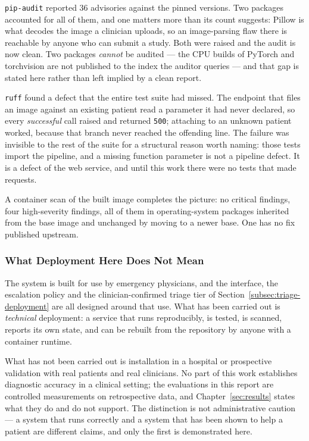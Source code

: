 \texttt{pip-audit} reported 36 advisories against the pinned versions. Two packages accounted
for all of them, and one matters more than its count suggests: Pillow is what decodes the image
a clinician uploads, so an image-parsing flaw there is reachable by anyone who can submit a
study. Both were raised and the audit is now clean. Two packages \emph{cannot} be audited ---
the CPU builds of PyTorch and torchvision are not published to the index the auditor queries
--- and that gap is stated here rather than left implied by a clean report.

\texttt{ruff} found a defect that the entire test suite had missed. The endpoint that files an
image against an existing patient read a parameter it had never declared, so every
\emph{successful} call raised and returned \texttt{500}; attaching to an unknown patient
worked, because that branch never reached the offending line. The failure was invisible to the
rest of the suite for a structural reason worth naming: those tests import the pipeline, and a
missing function parameter is not a pipeline defect. It is a defect of the web service, and
until this work there were no tests that made requests.

A container scan of the built image completes the picture: no critical findings, four
high-severity findings, all of them in operating-system packages inherited from the base image
and unchanged by moving to a newer base. One has no fix published upstream.

\subsubsection{What Deployment Here Does Not Mean}

The system is built for use by emergency physicians, and the interface, the escalation policy
and the clinician-confirmed triage tier of Section~\ref{subsec:triage-deployment} are all
designed around that use. What has been carried out is \emph{technical} deployment: a service
that runs reproducibly, is tested, is scanned, reports its own state, and can be rebuilt from
the repository by anyone with a container runtime.

What has not been carried out is installation in a hospital or prospective validation with real
patients and real clinicians. No part of this work establishes diagnostic accuracy in a clinical
setting; the evaluations in this report are controlled measurements on retrospective data, and
Chapter~\ref{sec:results} states what they do and do not support. The distinction is not
administrative caution --- a system that runs correctly and a system that has been shown to help
a patient are different claims, and only the first is demonstrated here.

